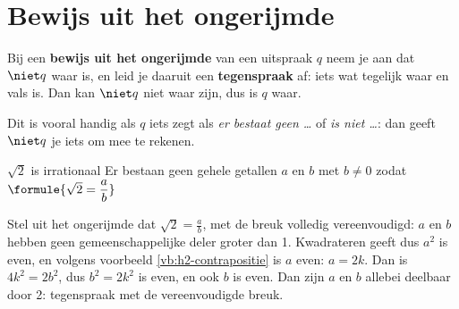 
\begin{oefeningen}

\end{oefeningen}

\section{Bewijs uit het ongerijmde}

\begin{theorie}
Bij een \textbf{\textcolor{accent}{bewijs uit het ongerijmde}} van een uitspraak $q$ neem je aan dat $\niet q$ waar is, en leid je daaruit een \textbf{\textcolor{accent}{tegenspraak}} af: iets wat tegelijk waar en vals is. Dan kan $\niet q$ niet waar zijn, dus is $q$ waar.
\end{theorie}

Dit is vooral handig als $q$ iets zegt als \textit{er bestaat geen \ldots} of \textit{is niet \ldots}: dan geeft $\niet q$ je iets om mee te rekenen.

\begin{theorie}
\begin{stelling}{$\sqrt2$ is irrationaal}
Er bestaan geen gehele getallen $a$ en $b$ met $b \neq 0$ zodat \quad $\formule{\sqrt2 = \dfrac{a}{b}}$
\end{stelling}

\begin{bewijs}
Stel uit het ongerijmde dat $\sqrt2 = \frac{a}{b}$, met de breuk volledig vereenvoudigd: $a$ en $b$ hebben geen gemeenschappelijke deler groter dan 1. Kwadrateren geeft
dus $a^2$ is even, en volgens voorbeeld \ref{vb:h2-contrapositie} is $a$ even: $a = 2k$. Dan is $4k^2 = 2b^2$, dus $b^2 = 2k^2$ is even, en ook $b$ is even. Dan zijn $a$ en $b$ allebei deelbaar door 2: tegenspraak met de vereenvoudigde breuk.
\end{bewijs}
\end{theorie}

